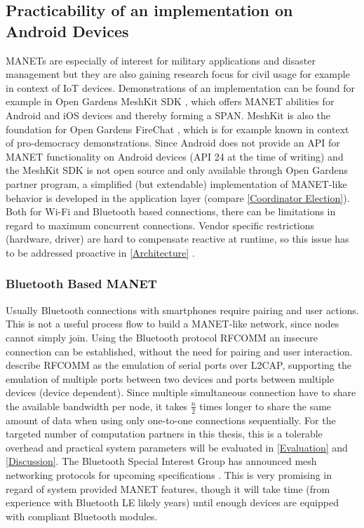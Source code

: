 \subsection{Practicability of an implementation on Android Devices} \label{practicability of an implementation}

\glspl{MANET} are especially of interest for military applications and disaster management but they are also gaining research focus for civil usage for example in context of \gls{IoT} devices. Demonstrations of an implementation can be found for example in Open Gardens MeshKit \gls{SDK} \autocite{Online:MeshKit}, which offers \gls{MANET} abilities for Android and iOS devices and thereby forming a \gls{SPAN}. MeshKit is also the foundation for Open Gardens FireChat \autocite{Online:FireChat}, which is for example known in context of pro-democracy demonstrations. Since Android does not provide an \gls{API} for \gls{MANET} functionality on Android devices (\gls{API} 24 at the time of writing) and the MeshKit \gls{SDK} is not open source and only available through Open Gardens partner program, a simplified (but extendable) implementation of \gls{MANET}-like behavior is developed in the application layer (compare \ref{Coordinator Election}).
Both for Wi-Fi and Bluetooth based connections, there can be limitations in regard to maximum concurrent connections. Vendor specific restrictions (hardware, driver) are hard to compensate reactive at runtime, so this issue has to be addressed proactive in \ref{Architecture} .

\subsubsection{Bluetooth Based \gls{MANET}}

Usually Bluetooth connections with smartphones require pairing and user actions. This is not a useful process flow to build a \gls{MANET}-like network, since nodes cannot simply join.
Using the Bluetooth protocol \gls{RFCOMM} an insecure connection can be established, without the need for pairing and user interaction. \textcite{RFCOMM2012} describe \gls{RFCOMM} as the emulation of serial ports over \gls{L2CAP}, supporting the emulation of multiple ports between two devices and ports between multiple devices (device dependent).
Since multiple simultaneous connection have to share the available bandwidth per node, it takes $\frac{n}{2}$ times longer to share the same amount of data when using only one-to-one connections sequentially. For the targeted number of computation partners in this thesis, this is a tolerable overhead and practical system parameters will be evaluated in \autoref{Evaluation} and \autoref{Discussion}.
The Bluetooth Special Interest Group has announced mesh networking protocols for upcoming specifications \autocite{Online:BluetoothMesh}. This is very promising in regard of system provided \gls{MANET} features, though it will take time (from experience with Bluetooth LE likely years) until enough devices are equipped with compliant Bluetooth modules.

